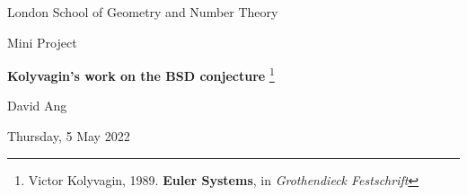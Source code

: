 \documentclass[10pt]{beamer}
\theoremstyle{definition}
\begin{document}
\begin{frame}

\begin{center}

{\scriptsize London School of Geometry and Number Theory}

\vspace{0.5cm}

Mini Project

\vspace{1cm}

\textbf{\large Kolyvagin's work on the BSD conjecture} \footnote{\scriptsize Victor Kolyvagin, 1989. \textbf{Euler Systems}, in \emph{Grothendieck Festschrift}}

\vspace{1cm}

David Ang

\vspace{0.5cm}

{\scriptsize Thursday, 5 May 2022}

\end{center}

\end{frame}
\end{document}
